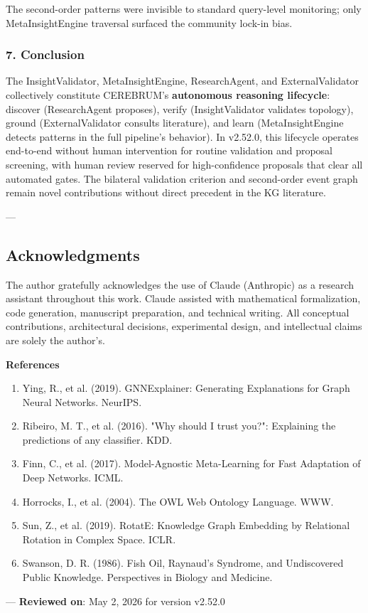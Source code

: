 The second-order patterns were invisible to standard query-level monitoring; only MetaInsightEngine traversal surfaced the community lock-in bias.

\subsubsection{7. Conclusion}
The InsightValidator, MetaInsightEngine, ResearchAgent, and ExternalValidator colle\-ctively constitute CEREBRUM's \textbf{autonomous reasoning lifecycle}: discover (ResearchAgent proposes), verify (InsightValidator validates topology), ground (ExternalValidator consults literature), and learn (MetaInsightEngine detects patterns in the full pipeline's behavior). In v2.52.0, this lifecycle operates end-to-end without human inter\-vention for routine validation and proposal screening, with human review reserved for high-confidence proposals that clear all automated gates. The bilateral validation criterion and second-order event graph remain novel contr\-ibutions without direct precedent in the KG literature.

---
\subsection{Acknow\-ledgments}

The author gratefully ackno\-wledges the use of Claude (Anthropic) as a research assistant throughout this work. Claude assisted with mathe\-matical forma\-lization, code generation, manuscript preparation, and technical writing. All conceptual contr\-ibutions, archi\-tectural decisions, exper\-imental design, and intel\-lectual claims are solely the author's.

\textbf{References}
\begin{enumerate}
\item Ying, R., et al. (2019). GNNExplainer: Generating Explan\-ations for Graph Neural Networks. NeurIPS.
\item Ribeiro, M. T., et al. (2016). "Why should I trust you?": Explaining the predictions of any classifier. KDD.
\item Finn, C., et al. (2017). Model-Agnostic Meta-Learning for Fast Adaptation of Deep Networks. ICML.
\item Horrocks, I., et al. (2004). The OWL Web Ontology Language. WWW.
\item Sun, Z., et al. (2019). RotatE: Knowledge Graph Embedding by Relational Rotation in Complex Space. ICLR.
\item Swanson, D. R. (1986). Fish Oil, Raynaud's Syndrome, and Undisc\-overed Public Knowledge. Perspe\-ctives in Biology and Medicine.

\end{enumerate}
---
\textbf{Reviewed on}: May 2, 2026 for version v2.52.0
